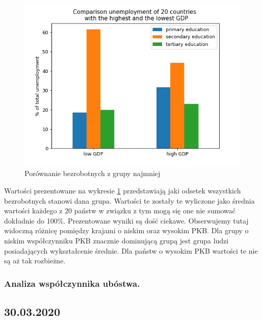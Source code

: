 \documentclass{article}
\begin{document}
\begin{figure}[h!]
\begin{center}
\includegraphics[width=5 in]{Pictures/9_unemployment_and_degree.png}
\end{center}
\captionsetup{justification=centering}
\caption{Porównanie bezrobotnych z grupy najmniej}
\label{fig:9_unemployment_vs_education}
\end{figure}

Wartości prezentowane na wykresie \ref{fig:9_unemployment_vs_education} przedstawiają jaki odsetek wszystkich bezrobotnych stanowi dana grupa. Wartości te zostały te wyliczone jako średnia wartości każdego z 20 państw w związku z tym mogą się one nie sumować dokładnie do 100\%. Prezentowane wyniki są dość ciekawe. Obserwujemy tutaj widoczną różnicę pomiędzy krajami o niskim oraz wysokim PKB. Dla grupy o niskim współczynniku PKB znacznie dominującą grupą jest grupa ludzi posiadających wykształcenie średnie. Dla państw o wysokim PKB wartości te nie są aż tak rozbieżne. 

\subsubsection{Analiza współczynnika ubóstwa.}

\clearpage

\subsection{30.03.2020}
\end{document}
